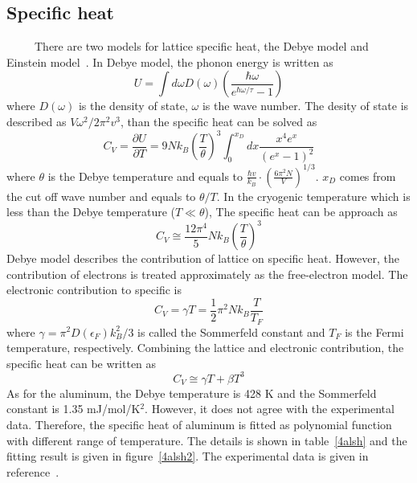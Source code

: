   \subsection{Specific heat}
~~~~~There are two models for lattice specific heat, the Debye model and Einstein model~\cite{kittle}.
In Debye model, the phonon energy is written as
\begin{equation}
 U = \int d\omega D(\omega) (\frac{\hbar \omega}{e^{\hbar \omega / \tau}-1})
\end{equation}
where $D(\omega)$ is the density of state, $\omega$ is the wave number.
The desity of state is described as $V\omega^2/2\pi^2v^3$, than the specific heat can be solved as
\begin{equation}
 C_V = \frac{\partial U}{\partial T} = 9 N k_B (\frac{T}{\theta})^3 \int^{x_D}_{0} dx \frac{x^4 e^x}{(e^x-1)^2}
\end{equation}
where $\theta$ is the Debye temperature and equals to $\frac{\hbar v}{k_B} \cdot (\frac{6\pi^2 N}{V})^{1/3}$.
$x_D$ comes from the cut off wave number and equals to $\theta/T$.
In the cryogenic temperature which is less than the Debye temperature ($T\ll\theta$), The specific heat can be approach as
\begin{equation}
 C_V \cong \frac{12 \pi^4}{5} N k_B (\frac{T}{\theta})^3
\end{equation}
Debye model describes the contribution of lattice on specific heat.
However, the contribution of electrons is treated approximately as the free-electron model.
The electronic contribution to specific is
\begin{equation}
 C_V = \gamma T = \frac{1}{2} \pi^2 N k_B \frac{T}{T_F}
\end{equation}
where $\gamma = \pi^2 D(\epsilon_F)k_B^2/3$ is called the Sommerfeld constant and $T_F$ is the Fermi temperature, respectively.
Combining the lattice and electronic contribution, the specific heat can be written as
\begin{equation}
 C_V \cong \gamma T + \beta T^3
\end{equation}
As for the aluminum, the Debye temperature is 428 K and the Sommerfeld constant is 1.35 mJ/mol/K$^2$.
However, it does not agree with the experimental data.
Therefore, the specific heat of aluminum is fitted as polynomial function with different range of temperature.
The details is shown in table~\ref{4alsh} and the fitting result is given in figure~\ref{4alsh2}.
The experimental data is given in reference~\cite{aldata}.
